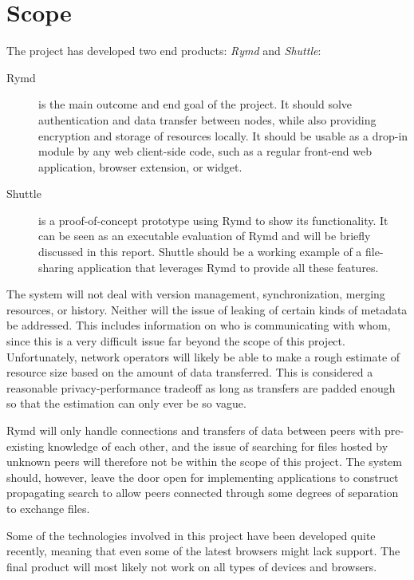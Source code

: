 \section{Scope}

The project has developed two end products: \emph{Rymd} and \emph{Shuttle}:

\begin{description}
\item[Rymd] is the main outcome and end goal of the project. It should solve authentication and data transfer between nodes, while also providing encryption and storage of resources locally. It should be usable as a drop-in module by any web client-side code, such as a regular front-end web application, browser extension, or widget.

\item[Shuttle] is a proof-of-concept prototype using Rymd to show its functionality. It can be seen as an executable evaluation of Rymd and will be briefly discussed in this report. Shuttle should be a working example of a file-sharing application that leverages Rymd to provide all these features.
\end{description}

The system will not deal with version management, synchronization, merging resources, or history. Neither will the issue of leaking of certain kinds of metadata be addressed. This includes information on who is communicating with whom, since this is a very difficult issue far beyond the scope of this project. Unfortunately, network operators will likely be able to make a rough estimate of resource size based on the amount of data transferred. This is considered a reasonable privacy-performance tradeoff as long as transfers are padded enough so that the estimation can only ever be so vague.

Rymd will only handle connections and transfers of data between peers with pre-existing knowledge of each other, and the issue of searching for files hosted by unknown peers will therefore not be within the scope of this project. The system should, however, leave the door open for implementing applications to construct propagating search to allow peers connected through some degrees of separation to exchange files.

Some of the technologies involved in this project have been developed quite recently, meaning that even some of the latest browsers might lack support. The final product will most likely not work on all types of devices and browsers.

